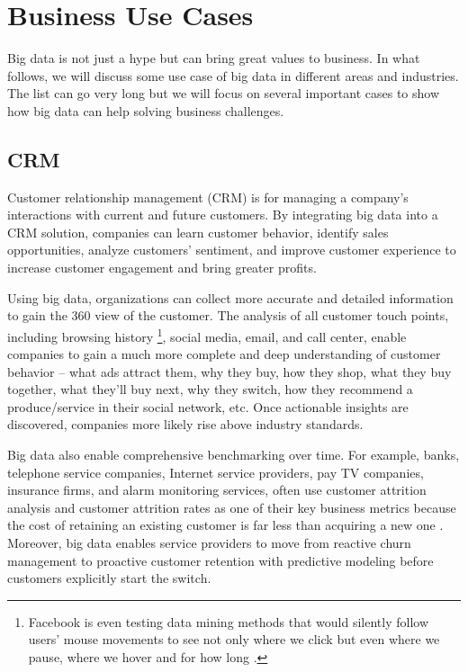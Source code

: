 \documentclass[11pt]{book}
\begin{document}
\section{Business Use Cases}

Big data is not just a hype but can bring great values to business. In what follows, we will discuss some use case of big data in different areas and industries. The list can go very long but we will focus on several important cases to show how big data can help solving business challenges.

\subsection{CRM}
Customer relationship management (CRM) is for managing a company's interactions with current and future customers. By integrating big data into a CRM solution, companies can learn customer behavior, identify sales opportunities, analyze customers' sentiment, and improve customer experience to increase customer engagement and bring greater profits.

Using big data, organizations can collect more accurate and detailed information to gain the 360 view of the customer. The analysis of all customer touch points, including browsing history \footnote{Facebook is even testing data mining methods that would silently follow users' mouse movements to see not only where we click but even where we pause, where we hover and for how long \cite{Facebook13Mouse}.}, social media, email, and call center, enable companies to gain a much more complete and deep understanding of customer behavior -- what ads attract them, why they buy, how they shop, what they buy together, what they'll buy next, why they switch, how they recommend a produce/service in their social network, etc. Once actionable insights are discovered, companies more likely rise above industry standards.

Big data also enable comprehensive benchmarking over time. For example, banks, telephone service companies, Internet service providers, pay TV companies, insurance firms, and alarm monitoring services, often use customer attrition analysis and customer attrition rates as one of their key business metrics because the cost of retaining an existing customer is far less than acquiring a new one \cite{ReichheldSasser1990}.
Moreover, big data enables service providers to move from reactive churn management to proactive customer retention with predictive modeling before customers explicitly start the switch.
\end{document}
